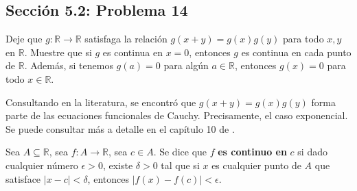 \subsection{Sección 5.2: Problema 14}

Deje que $g:\mathbb{R}\to\mathbb{R}$ satisfaga la relación $g(x+y)=g(x)g(y)$ para todo $x,y$ en $\mathbb{R}$. Muestre que si $g$ es continua en $x=0$, entonces $g$ es continua en cada punto de $\mathbb{R}$. Además, si tenemos $g(a)=0$ para algún $a\in\mathbb{R}$, entonces $g(x)=0$ para todo $x\in\mathbb{R}$.

\begin{tcolorbox}[colback=gray!15,colframe=gray!1!gray,title=Dato interesante]
Consultando en la literatura, se encontró que $g(x+y)=g(x)g(y)$ forma parte de las ecuaciones funcionales de Cauchy. Precisamente, el caso exponencial. Se puede consultar más a detalle en el capítulo 10 de \cite{jung2011hyers}.
\end{tcolorbox}

\begin{tcolorbox}[colback=blue!15,colframe=blue!1!blue,title=Definición de continuidad de Bartle \& Sherbert]
Sea $A\subseteq \mathbb{R}$, sea $f: A\to \mathbb{R}$, sea $c\in A$. Se dice que $f$ \textbf{es continuo en } $c$ si dado cualquier número $\epsilon>0$, existe $\delta>0$ tal que si $x$ es cualquier punto de $A$ que satisface $|x-c|<\delta$, entonces $|f(x)-f(c)|<\epsilon$.
\end{tcolorbox}

